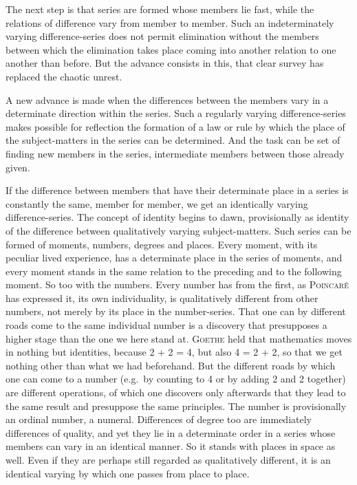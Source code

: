 \documentclass[12pt]{book}
\newcommand{\opage}[1]{\marginnote{\footnotesize\textit{[#1]}}}
\begin{document}
The next step is that series are formed whose members lie fast, while the
relations of difference vary from member to member. Such an indeterminately
varying difference-series does not permit elimination without the members
between which the elimination takes place coming into another relation to one
another than before. But the advance consists in this, that clear survey has
replaced the chaotic unrest.

A new advance is made when the differences between the members vary in a
determinate direction within the series. Such a regularly varying
difference-series makes possible for reflection the formation of a law or rule
by which the place of the subject-matters in the series can be determined. And
the task can be set of finding new members in the series, intermediate members
between those already given.

If the difference between members that have their determinate place in a series
is constantly the same, member for member, we get an identically varying
difference-series. The concept of identity begins to dawn, provisionally as
identity of the difference between qualitatively varying subject-matters. Such
series can be formed of moments, numbers, degrees and places. Every moment, with
its peculiar lived experience, has a determinate place in the series of moments,
and every moment stands in the same relation to the preceding and to the
following moment. So too with the numbers. Every number has from the first, as
\textsc{Poincaré} has expressed it, its own individuality, is qualitatively
different from other numbers, not merely by its place in the number-series. That
one can by different roads come to the same individual number is a discovery
that presupposes a higher stage than the one we here stand at. \textsc{Goethe}
held that mathematics moves in nothing but identities, because 2 + 2 = 4, but
also 4 = 2 + 2, so that we \opage{10}get nothing other than what we had beforehand. But
the different roads by which one can come to a number (e.g.\ by counting to 4 or
by adding 2 and 2 together) are different operations, of which one discovers
only afterwards that they lead to the same result and presuppose the same
principles. The number is provisionally an ordinal number, a numeral.
Differences of degree too are immediately differences of quality, and yet they
lie in a determinate order in a series whose members can vary in an identical
manner. So it stands with places in space as well. Even if they are perhaps
still regarded as qualitatively different, it is an identical varying by which
one passes from place to place.
\end{document}
